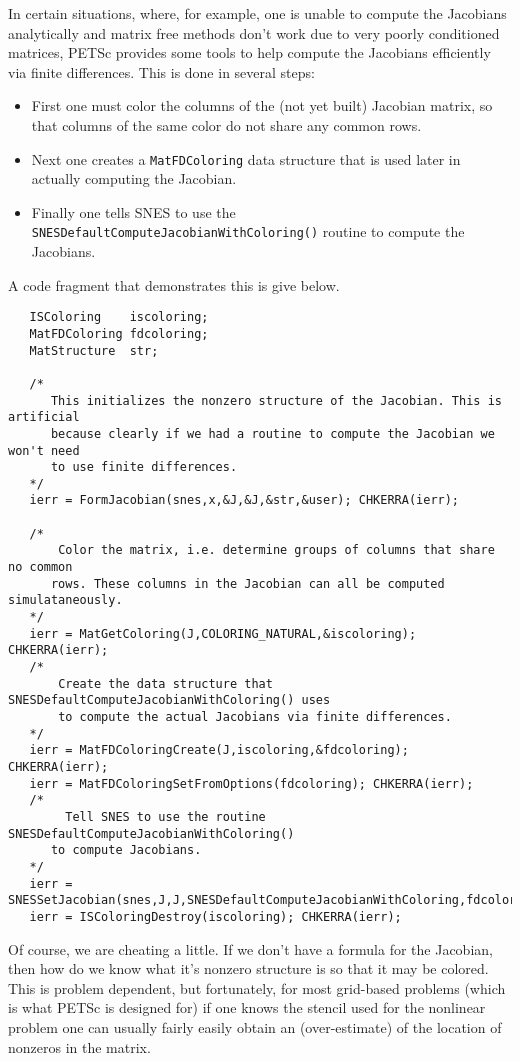 In certain situations, where, for example, one is unable to compute the Jacobians
analytically and matrix free methods don't work due to very poorly conditioned matrices,
PETSc provides some tools to help compute the Jacobians efficiently via 
finite differences. This is done in several steps:
\begin{itemize}
\item First one must color the columns of the (not yet built) Jacobian matrix, so that 
      columns of the same color do not share any common rows.
\item Next one creates a {\tt MatFDColoring} data structure that is used later in 
      actually computing the Jacobian.
\item Finally one tells SNES to use the {\tt SNESDefaultComputeJacobianWithColoring()}
      routine to compute the Jacobians. 
\end{itemize}
A code fragment that demonstrates this is give below.
\begin{verbatim}
   ISColoring    iscoloring;
   MatFDColoring fdcoloring;
   MatStructure  str;

   /* 
      This initializes the nonzero structure of the Jacobian. This is artificial
      because clearly if we had a routine to compute the Jacobian we won't need
      to use finite differences.
   */
   ierr = FormJacobian(snes,x,&J,&J,&str,&user); CHKERRA(ierr);

   /*
       Color the matrix, i.e. determine groups of columns that share no common 
      rows. These columns in the Jacobian can all be computed simulataneously.
   */
   ierr = MatGetColoring(J,COLORING_NATURAL,&iscoloring); CHKERRA(ierr);
   /*
       Create the data structure that SNESDefaultComputeJacobianWithColoring() uses
       to compute the actual Jacobians via finite differences.
   */
   ierr = MatFDColoringCreate(J,iscoloring,&fdcoloring); CHKERRA(ierr);
   ierr = MatFDColoringSetFromOptions(fdcoloring); CHKERRA(ierr);
   /*
        Tell SNES to use the routine SNESDefaultComputeJacobianWithColoring()
      to compute Jacobians.
   */
   ierr = SNESSetJacobian(snes,J,J,SNESDefaultComputeJacobianWithColoring,fdcoloring);CHKERRA(ierr);  
   ierr = ISColoringDestroy(iscoloring); CHKERRA(ierr);
\end{verbatim}

  
 

Of course, we are cheating a little. If we don't have a formula for the Jacobian, then
how do we know what it's nonzero structure is so that it may be colored. This is 
problem dependent, but fortunately, for most grid-based problems (which is what PETSc
is designed for) if one knows the stencil used for the nonlinear problem one can usually 
fairly easily obtain an (over-estimate) of the location of nonzeros in the matrix.

